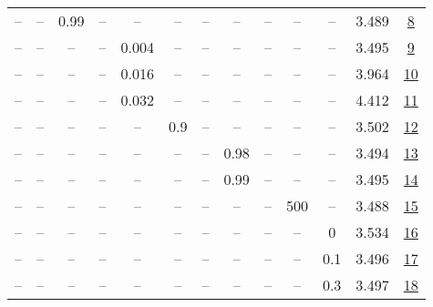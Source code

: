 \begin{table}[H]
\begin{tabular}{ccccccccccccc}
-- & -- & 0.99 & -- & -- & -- & -- & -- & -- & -- & -- & 3.489 & \href{https://wandb.ai/stanford-mercury/optimizer-scaling/runs/sweep-130m-2B-mudamd64abdblr0.008-wd0.2-minlr0-warmup1000-sb10.9-ef283b}{8} \\
-- & -- & -- & -- & 0.004 & -- & -- & -- & -- & -- & -- & 3.495 & \href{https://wandb.ai/stanford-mercury/optimizer-scaling/runs/sweep-130m-2B-mudamd3fb715lr0.004-wd0.2-minlr0-warmup1000-sb10.9-0ce29b}{9} \\
-- & -- & -- & -- & 0.016 & -- & -- & -- & -- & -- & -- & 3.964 & \href{https://wandb.ai/stanford-mercury/optimizer-scaling/runs/sweep-130m-2B-mudamd544689lr0.016-wd0.2-minlr0-warmup1000-sb10.9-0774cf}{10} \\
-- & -- & -- & -- & 0.032 & -- & -- & -- & -- & -- & -- & 4.412 & \href{https://wandb.ai/stanford-mercury/optimizer-scaling/runs/sweep-130m-2B-mudamda7bb25lr0.032-wd0.2-minlr0-warmup1000-sb10.9-7add26}{11} \\
-- & -- & -- & -- & -- & 0.9 & -- & -- & -- & -- & -- & 3.502 & \href{https://wandb.ai/stanford-mercury/optimizer-scaling/runs/sweep-130m-2B-mudamda64795lr0.008-wd0.2-minlr0-warmup1000-sb10.9-911367}{12} \\
-- & -- & -- & -- & -- & -- & -- & 0.98 & -- & -- & -- & 3.494 & \href{https://wandb.ai/stanford-mercury/optimizer-scaling/runs/sweep-130m-2B-mudamc4f232clr0.008-wd0.2-minlr0-warmup1000-sb10.9-b14923}{13} \\
-- & -- & -- & -- & -- & -- & -- & 0.99 & -- & -- & -- & 3.495 & \href{https://wandb.ai/stanford-mercury/optimizer-scaling/runs/sweep-130m-2B-mudamdd0726flr0.008-wd0.2-minlr0-warmup1000-sb10.9-f2770e}{14} \\
-- & -- & -- & -- & -- & -- & -- & -- & -- & 500 & -- & 3.488 & \href{https://wandb.ai/stanford-mercury/optimizer-scaling/runs/sweep-130m-2B-mudamd278320lr0.008-wd0.2-minlr0-warmup500-sb10.95-b0b075}{15} \\
-- & -- & -- & -- & -- & -- & -- & -- & -- & -- & 0 & 3.534 & \href{https://wandb.ai/stanford-mercury/optimizer-scaling/runs/sweep-130m-2B-mudamd3e2a48lr0.008-wd0-minlr0-warmup1000-sb10.95--085d9b}{16} \\
-- & -- & -- & -- & -- & -- & -- & -- & -- & -- & 0.1 & 3.496 & \href{https://wandb.ai/stanford-mercury/optimizer-scaling/runs/sweep-130m-2B-mudamd75718flr0.008-wd0.1-minlr0-warmup1000-sb10.9-83bd85}{17} \\
-- & -- & -- & -- & -- & -- & -- & -- & -- & -- & 0.3 & 3.497 & \href{https://wandb.ai/stanford-mercury/optimizer-scaling/runs/sweep-130m-2B-mudamdc61edclr0.008-wd0.3-minlr0-warmup1000-sb10.9-fba87c}{18} \\
\bottomrule
\end{tabular}
\end{table}

